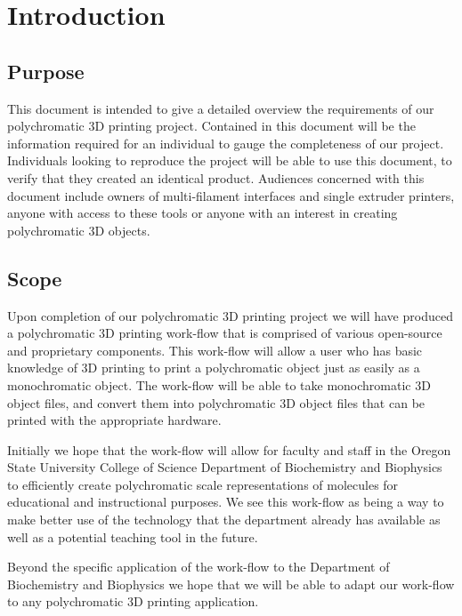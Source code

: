 \documentclass[letterpaper, onecolumn, draftclsnofoot, 10pt, compsoc]{IEEEtran}
\begin{document}
\section{Introduction}

\subsection{Purpose} %
This document is intended to give a detailed overview the requirements of our polychromatic 3D printing project.
Contained in this document will be the information required for an individual to gauge the completeness of our project.
Individuals looking to reproduce the project will be able to use this document, to verify that they created an identical product.
Audiences concerned with this document include owners of multi-filament interfaces and single extruder printers, anyone with access to these tools or anyone with an interest in creating polychromatic 3D objects.

\subsection{Scope} %
Upon completion of our polychromatic 3D printing project we will have produced a polychromatic 3D printing work-flow that is comprised of various open-source and proprietary components. 
This work-flow will allow a user who has basic knowledge of 3D printing to print a polychromatic object just as easily as a monochromatic object. 
The work-flow will be able to take monochromatic 3D object files, and convert them into polychromatic 3D object files that can be printed with the appropriate hardware.\par
Initially we hope that the work-flow will allow for faculty and staff in the Oregon State University College of Science Department of Biochemistry and Biophysics to efficiently create polychromatic scale representations of molecules for educational and instructional purposes.
We see this work-flow as being a way to make better use of the technology that the department already has available as well as a potential teaching tool in the future.\par
Beyond the specific application of the work-flow to the Department of Biochemistry and Biophysics we hope that we will be able to adapt our work-flow to any polychromatic 3D printing application.\par
\end{document}

